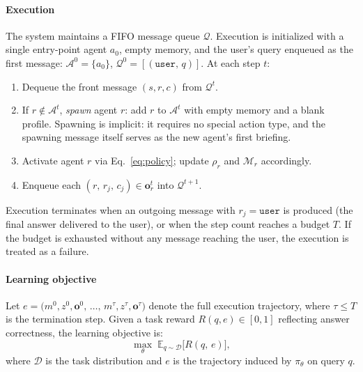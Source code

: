 \documentclass{article} %
\begin{document}
\paragraph{Execution}
The system maintains a FIFO message queue $\mathcal{Q}$.
Execution is initialized with a single entry-point agent $a_0$,
empty memory, and the user's query enqueued as the first message:
$\mathcal{A}^0 = \{a_0\}$, $\mathcal{Q}^0 = [(\texttt{user},\,q)]$.
At each step $t$:
\begin{enumerate}
    \item Dequeue the front message $(s, r, c)$ from $\mathcal{Q}^t$.
    \item If $r \notin \mathcal{A}^t$, \emph{spawn} agent $r$:
          add $r$ to $\mathcal{A}^t$ with empty memory and a blank profile.
          Spawning is implicit: it requires no special action type,
          and the spawning message itself serves as the new agent's first briefing.
    \item Activate agent $r$ via Eq.~\ref{eq:policy};
          update $\rho_r$ and $\mathcal{M}_r$ accordingly.
    \item Enqueue each $(r,\,r_j,\,c_j) \in \mathbf{o}_r^t$ into $\mathcal{Q}^{t+1}$.
\end{enumerate}
Execution terminates when an outgoing message with $r_j = \texttt{user}$
is produced (the final answer delivered to the user), or when the step
count reaches a budget $T$. If the budget is exhausted without any message
reaching the user, the execution is treated as a failure.

\paragraph{Learning objective}
Let $e = \bigl(m^0, z^0, \mathbf{o}^0,\,\ldots,\,m^\tau, z^\tau, \mathbf{o}^\tau\bigr)$
denote the full execution trajectory, where $\tau \leq T$ is the termination step.
Given a task reward $R(q, e) \in [0,1]$ reflecting answer correctness,
the learning objective is:
\begin{equation}
    \max_\theta\;\mathbb{E}_{q \sim \mathcal{D}}\bigl[R(q,\,e)\bigr],
    \label{eq:objective}
\end{equation}
where $\mathcal{D}$ is the task distribution and $e$ is the trajectory
induced by $\pi_\theta$ on query $q$.
\end{document}
